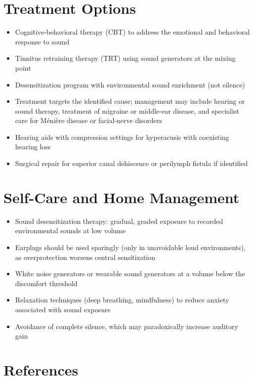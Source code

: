 \section*{Treatment Options}
\begin{itemize}
  \item Cognitive-behavioral therapy (CBT) to address the emotional and behavioral response to sound
  \item Tinnitus retraining therapy (TRT) using sound generators at the mixing point
  \item Desensitization program with environmental sound enrichment (not silence)
  \item Treatment targets the identified cause; management may include hearing or sound therapy, treatment of migraine or middle-ear disease, and specialist care for Ménière disease or facial-nerve disorders
  \item Hearing aids with compression settings for hyperacusis with coexisting hearing loss
  \item Surgical repair for superior canal dehiscence or perilymph fistula if identified
\end{itemize}

\section*{Self-Care and Home Management}
\begin{itemize}
  \item Sound desensitization therapy: gradual, graded exposure to recorded environmental sounds at low volume
  \item Earplugs should be used sparingly (only in unavoidable loud environments), as overprotection worsens central sensitization
  \item White noise generators or wearable sound generators at a volume below the discomfort threshold
  \item Relaxation techniques (deep breathing, mindfulness) to reduce anxiety associated with sound exposure
  \item Avoidance of complete silence, which may paradoxically increase auditory gain
\end{itemize}

\section*{References}

